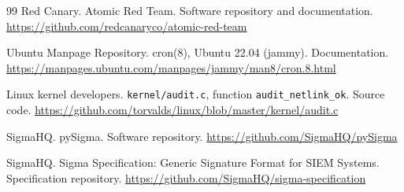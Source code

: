 \documentclass[11pt,a4paper]{article}
\begin{document}
\begin{thebibliography}{99}
Red Canary.
\newblock Atomic Red Team.
\newblock Software repository and documentation.
\newblock \url{https://github.com/redcanaryco/atomic-red-team}

Ubuntu Manpage Repository.
\newblock cron(8), Ubuntu 22.04 (jammy).
\newblock Documentation.
\newblock \url{https://manpages.ubuntu.com/manpages/jammy/man8/cron.8.html}

Linux kernel developers.
\newblock \texttt{kernel/audit.c}, function \texttt{audit\_netlink\_ok}.
\newblock Source code.
\newblock \url{https://github.com/torvalds/linux/blob/master/kernel/audit.c}

SigmaHQ.
\newblock pySigma.
\newblock Software repository.
\newblock \url{https://github.com/SigmaHQ/pySigma}

SigmaHQ.
\newblock Sigma Specification: Generic Signature Format for {SIEM} Systems.
\newblock Specification repository.
\newblock \url{https://github.com/SigmaHQ/sigma-specification}

\end{thebibliography}
\end{document}
